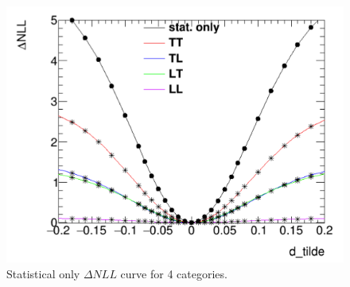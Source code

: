 \begin{figure}[h]
  \centering
  \includegraphics[width=.7\textwidth]{figure/NLLcurve_4cate.png}
  \caption{Statistical only $\Delta NLL$ curve for 4 categories. }
  \label{fig:NLLcurve_4cate}
\end{figure}



